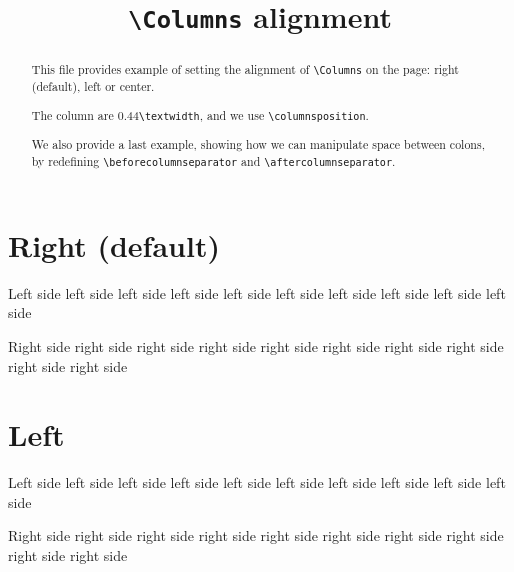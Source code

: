 \documentclass{article}
\begin{document}
\title{\texttt{\textbackslash Columns} alignment}
\date{}
\maketitle
\begin{abstract}
This file provides example of setting the alignment of \verb+\Columns+ on the page: right (default), left or center.

The column are 0.44\verb+\textwidth+, and we use \verb+\columnsposition+.

We also provide a last example, showing how we can manipulate space between colons, by redefining \verb+\beforecolumnseparator+ and \verb+\aftercolumnseparator+.
\end{abstract}


\section{Right (default)}

\begin{pairs}

\begin{Leftside}
\beginnumbering
\pstart
Left side left side left side left side left side left side left side left side left side left side 
\pend
\endnumbering
\end{Leftside}

\begin{Rightside}
\beginnumbering
\pstart
Right side right side right side right side right side right side right side right side right side right side 
\pend
\endnumbering
\end{Rightside}
\end{pairs}
\Columns

\section{Left}

\begin{pairs}

\begin{Leftside}
\beginnumbering
\pstart
Left side left side left side left side left side left side left side left side left side left side 
\pend
\endnumbering
\end{Leftside}

\begin{Rightside}
\beginnumbering
\pstart
Right side right side right side right side right side right side right side right side right side right side 
\pend
\endnumbering
\end{Rightside}
\end{pairs}
\Columns
\end{document}
